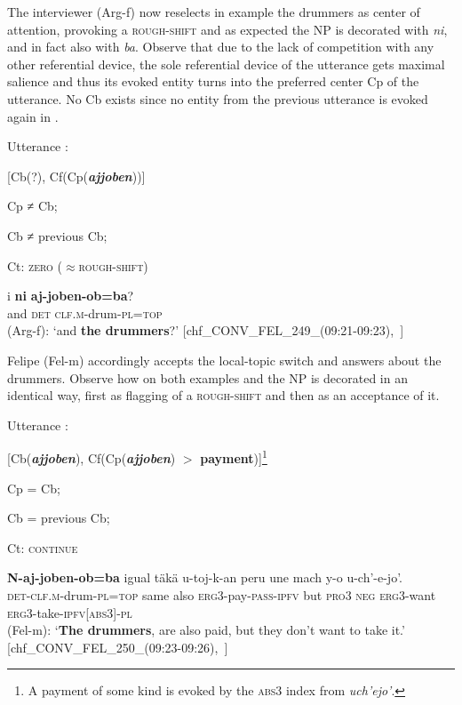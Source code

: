 \documentclass[output=paper
,modfonts
,nonflat]{langsci/langscibook}
\begin{document}
The interviewer (Arg-f) now reselects in example  the drummers as center of attention, provoking a \textsc{rough-shift} and as expected the NP is decorated with \textit{ni}, and in fact also with \textit{ba}. Observe that due to the lack of competition with any other referential device, the sole referential device of the utterance gets maximal salience and thus its evoked entity turns into the preferred center Cp of the utterance. No Cb exists since no entity from the previous utterance  is evoked again in .

\ea
Utterance :

[Cb(?), Cf(Cp(\textbf{\textit{ajjoben}}))]

Cp ≠ Cb;

Cb ≠ previous Cb;

Ct: \textsc{zero ($\approx$rough-shift)}
\z


\ea{}
\label{ex:pico:43}

\gll i \textbf{ni} \textbf{aj-joben-ob=ba}?
\\
and {\textsc{det}} {\textsc{clf.m}}-drum-{\textsc{pl}}={\textsc{top}}\\
\glt (Arg-f): `and \textbf{the drummers}?' [chf\_CONV\_FEL\_249\_(09:21-09:23),~\citealt{Delgado-Galvan2018archive}]
\z

Felipe (Fel-m) accordingly accepts the local-topic switch and answers about the drummers. Observe how on both examples  and  the NP is decorated in an identical way, first as flagging of a \textsc{rough-shift} and then as an acceptance of it. 

\ea
Utterance :

[Cb(\textbf{\textit{ajjoben}}), Cf(Cp(\textbf{\textit{ajjoben}}) $>$ \textbf{payment})]\footnote{A payment of some kind is evoked by the \textsc{abs3} index from \textit{uch'ejo'}.}

Cp = Cb;

Cb = previous Cb;

Ct: \textsc{continue}
\z


\ea{}
\label{ex:pico:45}

\gll \textbf{N-aj-joben-ob=ba} igual t\"ak\"a u-toj-k-an peru une mach y-o u-ch'-e-jo'.
\\
{\textsc{det}}-{\textsc{clf.m}}-drum-{\textsc{pl}}={\textsc{top}} same also {\textsc{erg3}}-pay-{\textsc{pass}}-{\textsc{ipfv}} but {\textsc{pro3}} {\textsc{neg}} {\textsc{erg3}}-want {\textsc{erg3}}-take-{\textsc{ipfv[abs3]}}-{\textsc{pl}}\\
\glt (Fel-m): `\textbf{The drummers}, are also paid, but they don't want to take it.' [chf\_CONV\_FEL\_250\_(09:23-09:26),~\citealt{Delgado-Galvan2018archive}]
\z
\end{document}
